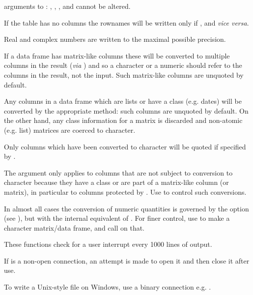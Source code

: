 \begin{Arguments}
\begin{ldescription}
\item[\code{...}] arguments to : ,
, ,  and 
cannot be altered.

\end{ldescription}
\end{Arguments}
%
\begin{Details}\relax
If the table has no columns the rownames will be written only if
, and \emph{vice versa}.

Real and complex numbers are written to the maximal possible precision.

If a data frame has matrix-like columns these will be converted to
multiple columns in the result (\emph{via} )
and so a character  or a numeric  should
refer to the columns in the result, not the input.  Such matrix-like
columns are unquoted by default.

Any columns in a data frame which are lists or have a class
(e.g. dates) will be converted by the appropriate 
method: such columns are unquoted by default.  On the other hand,
any class information for a matrix is discarded and non-atomic
(e.g. list) matrices are coerced to character.

Only columns which have been converted to character will be quoted if
specified by .

The  argument only applies to columns that are not subject
to conversion to character because they have a class or are part of a
matrix-like column (or matrix), in particular to columns protected by
.  Use  to control
such conversions.

In almost all cases the conversion of numeric quantities is governed
by the option  (see ), but with
the internal equivalent of .  For finer control, use
 to make a character matrix/data frame, and call
 on that.

These functions check for a user interrupt every 1000 lines of output.

If  is a non-open connection, an attempt is made to open it
and then close it after use.

To write a Unix-style file on Windows, use a binary connection
e.g. .
\end{Details}
